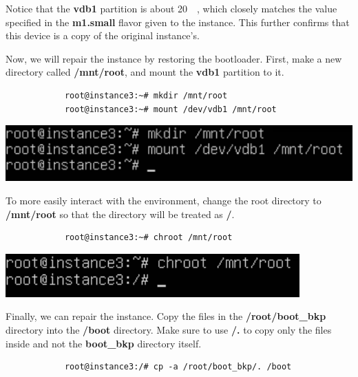 \documentclass[letterpaper, 12pt]{article}
\begin{document}
\begin{enumerate}
    \begin{notebox}
        Notice that the \textbf{vdb1} partition is about \qty{20}{\giga\byte}, which closely matches the value specified in the \textbf{m1.small} flavor given to the instance.
        This further confirms that this device is a copy of the original instance's.
    \end{notebox}

    \begin{labstep}
        Now, we will repair the instance by restoring the bootloader.
        First, make a new directory called \textbf{/mnt/root}, and mount the \textbf{vdb1} partition to it.
        \begin{lstlisting}
            root@instance3:~# mkdir /mnt/root
            root@instance3:~# mount /dev/vdb1 /mnt/root
        \end{lstlisting}

        \begin{center}
            \includegraphics[width=\linewidth]{images/part7/step18.png}
        \end{center}
    \end{labstep}

    \begin{labstep}
        To more easily interact with the environment, change the root directory to \textbf{/mnt/root} so that the directory will be treated as \textbf{/}.
        \begin{lstlisting}
            root@instance3:~# chroot /mnt/root
        \end{lstlisting}

        \begin{center}
            \includegraphics[width=\linewidth]{images/part7/step19.png}
        \end{center}
    \end{labstep}

    \begin{labstep}
        Finally, we can repair the instance.
        Copy the files in the \textbf{/root/boot\_bkp} directory into the \textbf{/boot} directory.
        Make sure to use \textbf{/.} to copy only the files inside and not the \textbf{boot\_bkp} directory itself.
        \begin{lstlisting}
            root@instance3:/# cp -a /root/boot_bkp/. /boot
        \end{lstlisting}


\end{labstep}
\end{enumerate}
\end{document}

